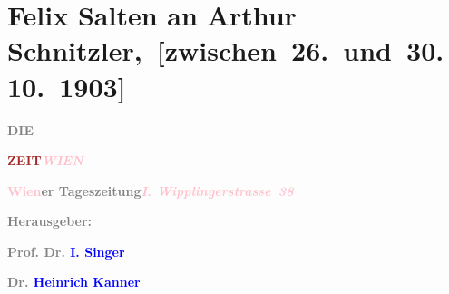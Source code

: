 

\renewcommand{\erwaehntePersonen}{Personen: Heinrich Kanner, Ernst Raupach, Isidor Singer}
\renewcommand{\erwaehnteInstitutionen}{Institutionen: Die Zeit}
\renewcommand{\erwaehnteOrte}{Orte: Raimund-Theater, Wien, Wipplingerstraße}
\renewcommand{\erwaehnteWerke}{Werke: Der Müller und sein Kind. Volksdrama in fünf Aufzügen}
\section[ Felix Salten an Arthur Schnitzler, {[}zwischen 26. und 30. 10. 1903{]}]{Felix Salten an Arthur
               Schnitzler, {[}zwischen 26. und 30. 10. 1903{]}}
\nopagebreak{}
\rehead{ }\normalsize\beginnumbering{}
\toendnotes[C]{\smallbreak\pagebreak[2]}
\toendnotes[C]{\smallbreak}
\pstart
           \noindent{}{\pb}\textcolor{gray}{\textbf{DIE}}\pend
           
\pstart
           \textcolor{gray}{\textbf{\textcolor{brown}{ZEIT}{}\ledrightnote{\textcolor{brown}{Die Zeit}}}}\hfill \textcolor{gray}{\textbf{\textcolor{pink}{\emph{WIEN}}{}\ledrightnote{\textcolor{pink}{Wien}}}}\pend
           
\pstart
           \textcolor{gray}{\textbf{\textcolor{pink}{Wien}{}\ledrightnote{\textcolor{pink}{Wien}}er Tageszeitung}}\hfill \textcolor{gray}{\textbf{\emph{\textcolor{pink}{I. Wipplingerstrasse 38}{}\ledrightnote{\textcolor{pink}{Wipplingerstraße}}}}}\pend
           
\pstart
           \textcolor{gray}{\textbf{Herausgeber:}}\pend
           
\pstart
           \textcolor{gray}{\textbf{\textbf{Prof. Dr. \textcolor{blue}{I. Singer}{}\ledrightnote{\textcolor{blue}{Isidor Singer}}}}}\pend
           
\pstart
           \textcolor{gray}{\textbf{\textbf{Dr. \textcolor{blue}{Heinrich Kanner}{}\ledrightnote{\textcolor{blue}{Heinrich Kanner}}}}}\pend
           
